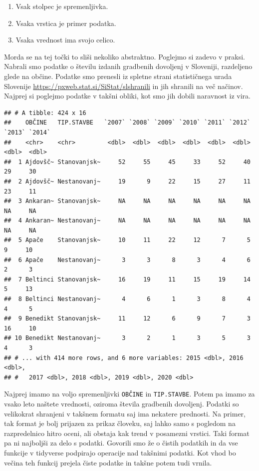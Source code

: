 \documentclass[
]{book}
\providecommand{\tightlist}{%
  \setlength{\itemsep}{0pt}\setlength{\parskip}{0pt}}
\begin{document}
\begin{enumerate}
\def\labelenumi{\arabic{enumi})}
\tightlist
\item
  Vsak stolpec je spremenljivka.
\item
  Vsaka vrstica je primer podatka.
\item
  Vsaka vrednost ima svojo celico.
\end{enumerate}

Morda se na tej točki to sliši nekoliko abstraktno. Poglejmo si zadevo v praksi. Nabrali smo podatke o številu izdanih gradbenih dovoljenj v Sloveniji, razdeljeno glede na občine. Podatke smo prenesli iz spletne strani statističnega urada Slovenije \url{https://pxweb.stat.si/SiStat/slshranili} in jih shranili na več načinov. Najprej si poglejmo podatke v takšni obliki, kot smo jih dobili naravnost iz vira.

\begin{verbatim}
## # A tibble: 424 x 16
##    OBČINE   TIP.STAVBE   `2007` `2008` `2009` `2010` `2011` `2012` `2013` `2014`
##    <chr>    <chr>         <dbl>  <dbl>  <dbl>  <dbl>  <dbl>  <dbl>  <dbl>  <dbl>
##  1 Ajdovšč~ Stanovanjsk~     52     55     45     33     52     40     29     30
##  2 Ajdovšč~ Nestanovanj~     19      9     22     15     27     11     23     11
##  3 Ankaran~ Stanovanjsk~     NA     NA     NA     NA     NA     NA     NA     NA
##  4 Ankaran~ Nestanovanj~     NA     NA     NA     NA     NA     NA     NA     NA
##  5 Apače    Stanovanjsk~     10     11     22     12      7      5      9     10
##  6 Apače    Nestanovanj~      3      3      8      3      4      6      2      3
##  7 Beltinci Stanovanjsk~     16     19     11     15     19     14      5     13
##  8 Beltinci Nestanovanj~      4      6      1      3      8      4      4      5
##  9 Benedikt Stanovanjsk~     11     12      6      9      7      3     16     10
## 10 Benedikt Nestanovanj~      3      2      1      3      5      3      4      3
## # ... with 414 more rows, and 6 more variables: 2015 <dbl>, 2016 <dbl>,
## #   2017 <dbl>, 2018 <dbl>, 2019 <dbl>, 2020 <dbl>
\end{verbatim}

Najprej imamo na voljo spremenljivki \texttt{OBČINE} in \texttt{TIP.STAVBE}. Potem pa imamo za vsako leto naštete vrednosti, oziroma števila gradbenih dovoljenj. Podatki so velikokrat shranjeni v takšnem formatu saj ima nekatere prednosti. Na primer, tak format je bolj prijazen za prikaz človeku, saj lahko samo s pogledom na razpredelnico hitro oceni, ali obstaja kak trend v posamezni vrstici. Taki format pa ni najboljši za delo s podatki. Govorili smo že o čistih podatkih in da vse funkcije v tidyverse podpirajo operacije nad takšnimi podatki. Kot vhod bo večina teh funkcij prejela čiste podatke in takšne potem tudi vrnila.
\end{document}
